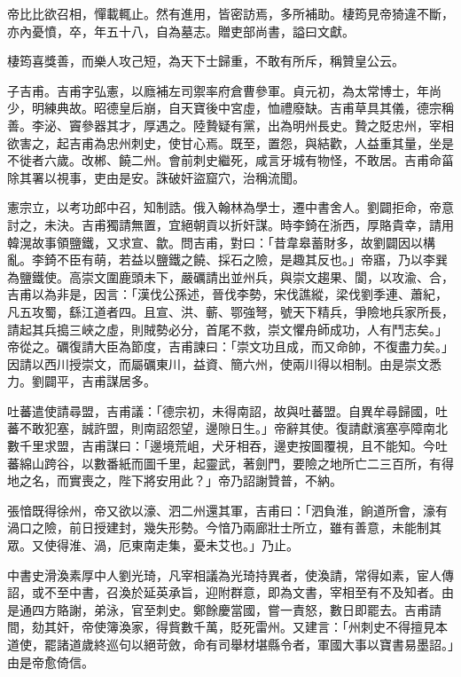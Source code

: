 \begin{pinyinscope}
 帝比比欲召相，憚載輒止。然有進用，皆密訪焉，多所補助。棲筠見帝猗違不斷，亦內憂憤，卒，年五十八，自為墓志。贈吏部尚書，謚曰文獻。



 棲筠喜獎善，而樂人攻己短，為天下士歸重，不敢有所斥，稱贊皇公云。



 子吉甫。吉甫字弘憲，以廕補左司禦率府倉曹參軍。貞元初，為太常博士，年尚少，明練典故。昭德皇后崩，自天寶後中宮虛，恤禮廢缺。吉甫草具其儀，德宗稱善。李泌、竇參器其才，厚遇之。陸贄疑有黨，出為明州長史。贄之貶忠州，宰相欲害之，起吉甫為忠州刺史，使甘心焉。既至，置怨，與結歡，人益重其量，坐是不徙者六歲。改郴、饒二州。會前刺史繼死，咸言牙城有物怪，不敢居。吉甫命菑除其署以視事，吏由是安。誅破奸盜窟穴，治稱流聞。



 憲宗立，以考功郎中召，知制誥。俄入翰林為學士，遷中書舍人。劉闢拒命，帝意討之，未決。吉甫獨請無置，宜絕朝貢以折奸謀。時李錡在浙西，厚賂貴幸，請用韓滉故事領鹽鐵，又求宣、歙。問吉甫，對曰：「昔韋皋蓄財多，故劉闢因以構亂。李錡不臣有萌，若益以鹽鐵之饒、採石之險，是趣其反也。」帝寤，乃以李巽為鹽鐵使。高崇文圍鹿頭未下，嚴礪請出並州兵，與崇文趨果、閬，以攻渝、合，吉甫以為非是，因言：「漢伐公孫述，晉伐李勢，宋伐譙縱，梁伐劉季連、蕭紀，凡五攻蜀，繇江道者四。且宣、洪、蘄、鄂強弩，號天下精兵，爭險地兵家所長，請起其兵搗三峽之虛，則賊勢必分，首尾不救，崇文懼舟師成功，人有鬥志矣。」帝從之。礪復請大臣為節度，吉甫諫曰：「崇文功且成，而又命帥，不復盡力矣。」因請以西川授崇文，而屬礪東川，益資、簡六州，使兩川得以相制。由是崇文悉力。劉闢平，吉甫謀居多。



 吐蕃遣使請尋盟，吉甫議：「德宗初，未得南詔，故與吐蕃盟。自異牟尋歸國，吐蕃不敢犯塞，誠許盟，則南詔怨望，邊隙日生。」帝辭其使。復請獻濱塞亭障南北數千里求盟，吉甫謀曰：「邊境荒岨，犬牙相吞，邊吏按圖覆視，且不能知。今吐蕃綿山跨谷，以數番紙而圖千里，起靈武，著劍門，要險之地所亡二三百所，有得地之名，而實喪之，陛下將安用此？」帝乃詔謝贊普，不納。



 張愔既得徐州，帝又欲以濠、泗二州還其軍，吉甫曰：「泗負淮，餉道所會，濠有渦口之險，前日授建封，幾失形勢。今愔乃兩廊壯士所立，雖有善意，未能制其眾。又使得淮、渦，厄東南走集，憂未艾也。」乃止。



 中書史滑渙素厚中人劉光琦，凡宰相議為光琦持異者，使渙請，常得如素，宦人傳詔，或不至中書，召渙於延英承旨，迎附群意，即為文書，宰相至有不及知者。由是通四方賂謝，弟泳，官至刺史。鄭餘慶當國，嘗一責怒，數日即罷去。吉甫請間，劾其奸，帝使簿渙家，得貲數千萬，貶死雷州。又建言：「州刺史不得擅見本道使，罷諸道歲終巡句以絕苛斂，命有司舉材堪縣令者，軍國大事以寶書易墨詔。」由是帝愈倚信。




\end{pinyinscope}
